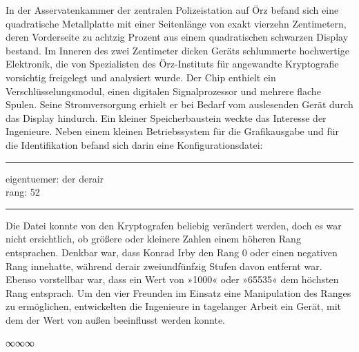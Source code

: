 In der Asservatenkammer der zentralen Polizeistation auf Örz befand sich eine quadratische Metallplatte mit einer Seitenlänge von exakt vierzehn Zentimetern, deren Vorderseite zu achtzig Prozent aus einem quadratischen schwarzen Display bestand. Im Inneren des zwei Zentimeter dicken Geräts schlummerte hochwertige Elektronik, die von Spezialisten des Örz-Instituts für angewandte Kryptografie vorsichtig freigelegt und analysiert wurde. Der Chip enthielt ein Verschlüsselungsmodul, einen digitalen Signalprozessor und mehrere flache Spulen. Seine Stromversorgung erhielt er bei Bedarf vom auslesenden Gerät durch das Display hindurch. Ein kleiner Speicherbaustein weckte das Interesse der Ingenieure. Neben einem kleinen Betriebssystem für die Grafikausgabe und für die Identifikation befand sich darin eine Konfigurationsdatei:

\noindent \parbox{\textwidth}{ \vspace{3ex} \hrule \vspace{3ex}

    \begin{footnotesize}
    \begin{ttfamily}

\noindent eigentuemer: der derair\\
\noindent rang: 52

    \end{ttfamily}
    \end{footnotesize}

\vspace{3ex} \hrule \vspace{3ex} }

Die Datei konnte von den Kryptografen beliebig verändert werden, doch es war nicht ersichtlich, ob größere oder kleinere Zahlen einem höheren Rang entsprachen. Denkbar war, dass Konrad Irby den Rang 0 oder einen negativen Rang innehatte, während derair zweiundfünfzig Stufen davon entfernt war. Ebenso vorstellbar war, dass ein Wert von »1000« oder »65535« dem höchsten Rang entsprach. Um den vier Freunden im Einsatz eine Manipulation des Ranges zu ermöglichen, entwickelten die Ingenieure in tagelanger Arbeit ein Gerät, mit dem der Wert von außen beeinflusst werden konnte.

\begin{center}
∞∞∞
\end{center}

